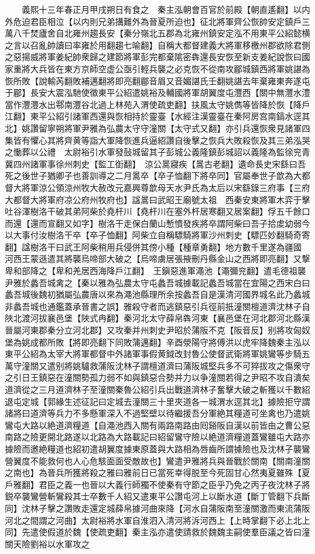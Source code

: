 　　義熙十三年春正月甲戌朔日有食之　秦主泓朝會百官於前殿【朝直遙翻】以内外危迫君臣相泣【以内則兄弟搆難外為晉夏所迫也】征北將軍齊公恢帥安定鎮戶三萬八千焚廬舍自北雍州趨長安【秦分嶺北五郡為北雍州鎮安定泓不用東平公紹懿横之言以召亂帥讀曰率雍於用翻趨七喻翻】自稱大都督建義大將軍移檄州郡欲除君側之惡揚威將軍姜紀帥衆歸之建節將軍彭完都棄隂密犇還長安恢至新支姜紀說恢曰國家重將大兵皆在東方京師空虚公亟引輕兵襲之必克恢不從南攻郿城鎮西將軍姚諶為恢所敗【說輸芮翻敗補邁翻將即亮翻郿音眉又音媚諶氏壬翻姚諶去年棄雍東奔遂屯于郿】長安大震泓馳使徵東平公紹遣姚裕及輔國將軍胡翼度屯灃西【關中無灃水澧當作灃灃水出鄠南灃谷北過上林苑入渭使疏吏翻】扶風太守姚儁等皆降於恢【降戶江翻】東平公紹引諸軍西還與恢相持於靈臺【水經注漢靈臺在秦阿房宫南鎬水逕其北】姚讚留寧朔將軍尹雅為弘農太守守潼關【太守式又翻】亦引兵還恢衆見諸軍四集皆有懼心其將齊黄等詣大軍降恢進兵逼紹讚自後擊之恢兵大敗殺恢及其三弟泓哭之慟葬以公禮　太尉裕引水軍發鼔城留其子彭城公義隆鎮彭城詔以義隆為監徐兖青冀四州諸軍事徐州刺史【監工衘翻】　涼公暠寢疾【暠古老翻】遺命長史宋繇曰吾死之後世子猶卿子也善訓導之二月暠卒【卒子恤翻下將卒同】官屬奉世子歆為大都督大將軍涼公領涼州牧大赦改元嘉興尊歆母天水尹氏為太后以宋繇錄三府事【三府大都督大將軍府凉公府州牧府也】諡暠曰武昭王廟號太祖　西秦安東將軍木弈于擊吐谷渾樹洛干破其弟阿柴於堯杆川【堯杆川在塞外杆居寒翻又居案翻】俘五千餘口而還【還而宣翻又如字】樹洛干走保白蘭山慙憤發疾將卒謂阿柴曰吾子拾䖍幼弱今以大事付汝樹洛干卒【卒子恤翻】阿柴立自稱驃騎將軍沙州刺史【驃匹妙翻騎奇寄翻】諡樹洛干曰武王阿柴稍用兵侵併其傍小種【種章勇翻】地方數千里遂為疆國　河西王蒙遜遣其將襲烏啼部大破之【烏啼虜居張掖刪丹縣金山之西將即亮翻】又撃卑和部降之【卑和羌居西海降戶江翻】　王鎭惡進軍澠池【澠彌兖翻】遣毛德祖襲尹雅於蠡吾城禽之【秦以雅為弘農太守屯蠡吾城據載記蠡吾城當在宜陽之西宋白曰蠡吾城後魏初猶屬弘農唐以來為澠池縣理所余按蠡吾自是漢清河國界城名此乃蠡城非蠡吾城也通鑑蓋承晉書之誤】雅殺守者而逃鎮惡引兵徑前扺潼關檀道濟沈林子自陜北渡河拔襄邑堡【陜式冉翻】秦河北太守薛帛犇河東【襄邑堡在河北郡河北縣漢晉屬河東郡秦分立河北郡】又攻秦并州刺史尹昭於蒲阪不克【阪音反】别將攻匈奴堡為姚成都所敗【將即亮翻下同敗蒲邁翻】辛酉滎陽守將傅洪以虎牢降魏秦主泓以東平公紹為太宰大將軍都督中外諸軍事假黄鉞改封魯公使督武衛將軍姚鸞等步騎五萬守潼關又遣别將姚驢救蒲阪沈林子謂檀道濟曰蒲阪城堅兵多不可猝拔攻之傷衆守之引日王鎮惡在潼關勢孤力弱不如與鎮惡合勢并力以争潼關若得之尹昭不攻自潰矣道濟從之三月道濟林子至潼關秦魯公紹引兵出戰道濟林子奮擊大破之斬獲以千數紹退屯定城【郭緣生述征記曰定城去潼關三十里夾道各一城渭水逕其北】據險拒守謂諸將曰道濟等兵力不多懸軍深入不過堅壁以待繼援吾分軍絶其糧道可坐禽也乃遣姚鸞屯大路以絶道濟糧道【自澠池西入關有兩路南路由囘谿阪自漢以前皆由之曹公惡南路之險更開北路遂以北路為大路載記曰紹留鸞守險以絶道濟糧道蓋鸞雖屯大路亦據險而邀絶糧道也紹初遣胡翼度據東原蓋與大路相為唇齒所謂據險也及沈林子襲鸞營翼度不能救何也人心危駭面面受敵故也】鸞遣尹雅將兵與晉戰於關南【關南潼關之南也】為晉兵所獲將殺之雅曰雅前日已當死幸得脱至今死固甘心然夷夏雖殊【夏戶雅翻】君臣之義一也晉以大義行師獨不使秦有守節之臣乎乃免之丙子夜沈林子將鋭卒襲鸞營斬鸞殺其士卒數千人紹又遣東平公讚屯河上以斷水道【斷丁管翻下兵斷同】沈林子擊之讚敗走還定城薛帛據河曲來降【河水自蒲阪南至潼關激而東流蒲阪河北之間謂之河曲】太尉裕將水軍自淮泗入清河將泝河西上【上時掌翻下必上北上同】先遣使假道於魏【使疏吏翻】秦主泓亦遣使請救於魏魏主嗣使羣臣議之皆曰潼關天險劉裕以水軍攻之